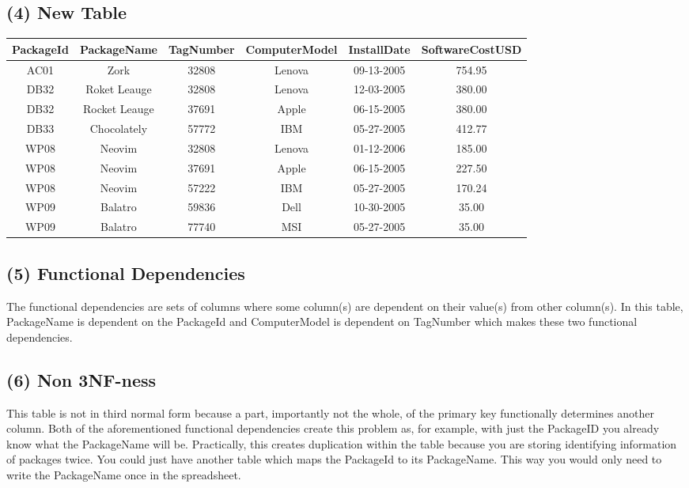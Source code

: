 \documentclass[letterpaper, 10pt]{article}
\begin{document}
\subsection{(4) New Table}
\begin{table}[h]
\centering
\begin{tabular}{|c|c|c|c|c|c|}
\hline
PackageId & PackageName & TagNumber & ComputerModel & InstallDate & SoftwareCostUSD \\
\hline
AC01 & Zork & 32808 & Lenova & 09-13-2005 & 754.95 \\
\cline{1-6}
DB32 & Roket Leauge & 32808 & Lenova & 12-03-2005 & 380.00 \\
\cline{1-6}
DB32 & Rocket Leauge & 37691 & Apple & 06-15-2005 & 380.00 \\
\cline{1-6}
DB33 & Chocolately & 57772 & IBM & 05-27-2005 & 412.77 \\
\cline{1-6}
WP08 & Neovim & 32808 & Lenova & 01-12-2006 & 185.00 \\
\cline{1-6}
WP08 & Neovim & 37691 & Apple & 06-15-2005 & 227.50 \\
\cline{1-6}
WP08 & Neovim & 57222 & IBM & 05-27-2005 & 170.24 \\
\cline{1-6}
WP09 & Balatro & 59836 & Dell & 10-30-2005 & 35.00 \\
\cline{1-6}
WP09 & Balatro & 77740 & MSI & 05-27-2005 & 35.00 \\
\hline
\end{tabular}
\end{table}
\subsection{(5) Functional Dependencies}
The functional dependencies are sets of columns where some
    column(s) are dependent on their value(s) from other column(s).
In this table, PackageName is dependent on the PackageId and
    ComputerModel is dependent on TagNumber which makes these two
    functional dependencies.
\subsection{(6) Non 3NF-ness}
This table is not in third normal form because a part,
    importantly not the whole, of the primary key
    functionally determines another column.
Both of the aforementioned functional dependencies create
    this problem as, for example, with just the PackageID
    you already know what the PackageName will be.
Practically, this creates duplication within the table
    because you are storing identifying information of packages
    twice.
You could just have another table which maps the PackageId
    to its PackageName.
This way you would only need to write the PackageName once
    in the spreadsheet.
\end{document}
